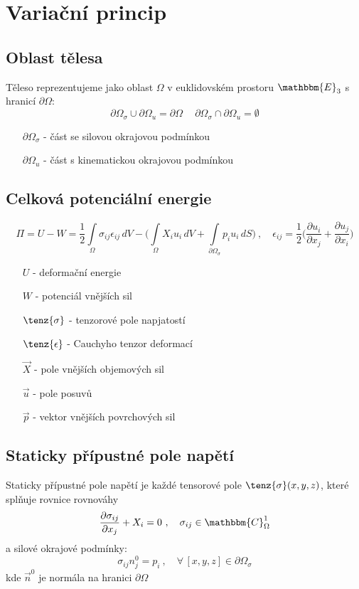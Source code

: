 \documentclass[10pt,oneside]{article}
\begin{document}
\section*{Variační princip}
\subsection*{Oblast tělesa}

Těleso reprezentujeme jako oblast $\Omega$ v euklidovském prostoru $\mathbbm{E}_3$ s hranicí $\partial\Omega$:
%
\begin{equation*}
	\partial\Omega_\sigma \cup \partial\Omega_u = \partial\Omega \ \quad \partial\Omega_\sigma \cap \partial\Omega_u = \emptyset
\end{equation*}
%
\begin{itemize}
	\item[$\partial\Omega_\sigma$] - část se silovou okrajovou podmínkou
	\item[$\partial\Omega_u$] - část s kinematickou okrajovou podmínkou
\end{itemize}

\subsection*{Celková potenciální energie}
%
\begin{equation*}
	\Pi = U - W = \frac{1}{2}\int\limits_\Omega \sigma_{ij} \epsilon_{ij} \,dV - \Bigg( \int\limits_\Omega X_i u_i \,dV + \int\limits_{\partial\Omega_\sigma} p_i u_i \,dS \Bigg)
	\ ,\quad
	\epsilon_{ij} = \frac{1}{2} \bigg(\frac{\partial u_i}{\partial x_j} + \frac{\partial u_j}{\partial x_i} \bigg)
\end{equation*}
%
\begin{itemize}
	\item[$U$] - deformační energie
	\item[$W$] - potenciál vnějších sil
	\item[$\tenz{\sigma}$] - tenzorové pole napjatostí
	\item[$\tenz{\epsilon}$] - Cauchyho tenzor deformací
	\item[$\vec{X}$] - pole vnějších objemových sil
	\item[$\vec{u}$] - pole posuvů
	\item[$\vec{p}$] - vektor vnějších povrchových sil
\end{itemize}

\subsection*{Staticky přípustné pole napětí}
%
Staticky přípustné pole napětí je každé tensorové pole $\tenz{\sigma}(x,y,z)$, které splňuje rovnice rovnováhy
%
\begin{equation*}
	\frac{\partial \sigma_{ij}}{\partial x_j} + X_i = 0 \ ,\quad \sigma_{ij} \in \mathbbm{C}^1_\Omega
\end{equation*}
%
a silové okrajové podmínky:
%
\begin{equation*}
	\sigma_{ij} n^0_j = p_i \ ,\quad \forall\,[x,y,z] \in \partial\Omega_\sigma
\end{equation*}
%
kde $\vec{n}^0$ je normála na hranici $\partial\Omega$
\end{document}
